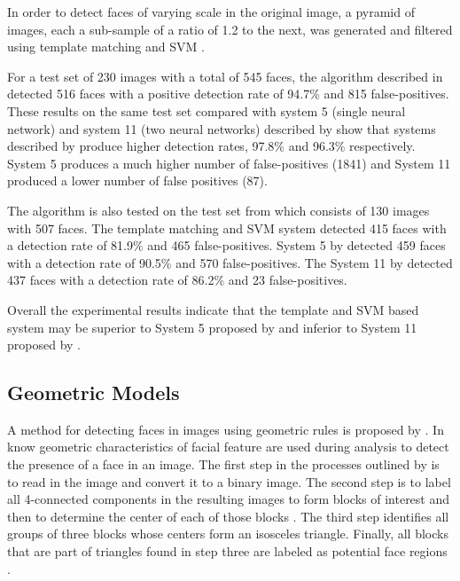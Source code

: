In order to detect faces of varying scale in the original image, a pyramid of images, each a sub-sample of a ratio of 1.2 to the next, was generated and filtered using template matching and SVM \cite{ai2001face}. 


For a test set of 230 images with a total of 545 faces, the algorithm described in \cite{ai2001face} detected 516 faces with a positive detection rate of 94.7\% and 815 false-positives. These results on the same test set compared with system 5 (single neural network) and system 11 (two neural networks) described by \cite{rowley1998nn} show that systems described by \cite{rowley1998nn} produce higher detection rates, 97.8\% and 96.3\% respectively. System 5 produces a much higher number of false-positives (1841) and System 11 produced a lower number of false positives (87).

The algorithm is also tested on the test set from \cite{rowley1998nn} which consists of 130 images with 507 faces. The template matching and SVM system detected 415 faces with a detection rate of 81.9\% and 465 false-positives. System 5 by \cite{rowley1998nn} detected 459 faces with a detection rate of 90.5\% and 570 false-positives. The System 11 by \cite{rowley1998nn} detected 437 faces with a detection rate of 86.2\% and 23 false-positives.

Overall the experimental results indicate that the template and SVM based system may be superior to System 5 proposed by \cite{rowley1998nn} and inferior to System 11 proposed by \cite{rowley1998nn}.



\subsection{Geometric Models}
A method for detecting faces in images using geometric rules is proposed by \cite{lin2000human}. In \cite{lin2000human} know geometric characteristics of facial feature are used during analysis to detect the presence of a face in an image. The first step in the processes outlined by \cite{lin2000human} is to read in the image and convert it to a binary image. The second step is to label all 4-connected components in the resulting images to form blocks of interest and then to determine the center of each of those blocks \cite{lin2000human}. The third step identifies all groups of three blocks whose centers form an isosceles triangle. Finally, all blocks that are part of triangles found in step three are labeled as potential face regions \cite{lin2000human}.

